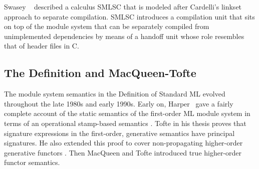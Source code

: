 Swasey \etal~\cite{swasey06} described a calculus SMLSC that is modeled after Cardelli's linkset approach to separate compilation. SMLSC introduces a compilation unit that sits on top of the module system that can be separately compiled from unimplemented dependencies by means of a handoff unit whose role resembles that of header files in C.

\subsection{The Definition and MacQueen-Tofte}
The module system semantics in the Definition of Standard ML \cite{mth90,mthm97} evolved throughout the late 1980s and early 1990s. Early on, Harper \etal~gave a fairly complete account of the static semantics of the first-order ML module system in terms of an operational stamp-based semantics \cite{hmt:tapsoft87}. Tofte in his thesis  \cite{toftethesis} proves that signature expressions in the first-order, generative semantics have principal signatures. He also extended this proof to cover non-propagating higher-order generative functors \cite{tofte:jfp94}. Then MacQueen and Tofte \cite{mt94} introduced true higher-order functor semantics. 


